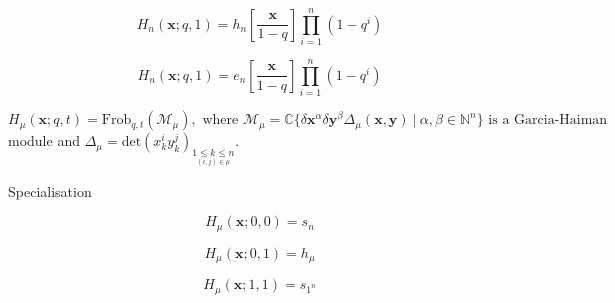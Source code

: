 \documentclass[12pt]{amsart}
\begin{document}
\begin{mdframed}[linecolor=red!20,linewidth=3pt,innertopmargin=8pt]
	\begin{minipage}[t]{9cm}
		\begin{bf}\end{bf}
		\begin{equation}H_n(\bm{x};q,1)=h_n\left[\frac{\bm{x}}{1-q}\right]\overset{n}{\underset{i=1}{\prod}}(1-q^i)
		\end{equation}
	\end{minipage}
	\begin{minipage}[t]{10cm}
		\begin{bf}\end{bf}
		\begin{equation}H_n(\bm{x};q,1)=e_n\left[\frac{\bm{x}}{1-q}\right]\overset{n}{\underset{i=1}{\prod}}(1-q^i)
		\end{equation}
	\end{minipage}
	\begin{minipage}[t]{19.25cm}
		 \begin{equation} H_\mu(\bm{x};q,t)=\textrm{Frob}_{q,t}(\mathcal{M}_\mu),  \text{ where }  \mathcal{M_\mu}=\mathbb{C}\{\delta\bm{x}^\alpha\delta\bm{y}^\beta\Delta_\mu(\bm{x}, \bm{y})~|~\alpha, \beta \in \mathbb{N}^n\}\text{ is a Garcia-Haiman} 
		 \end{equation}
 module  and $\Delta_\mu=\textrm{det}(x_k^iy_k^j)_{\underset{(i,j)\in\mu}{1\leq k \leq n}}$.
 	\end{minipage}
 
	 \begin{minipage}[t]{7cm}
		\begin{bf}Specialisation\end{bf}
		\begin{equation}H_\mu(\bm{x};0,0)=s_n
		\end{equation}
	\end{minipage}
	\begin{minipage}[t]{6cm}
		\begin{equation}H_\mu(\bm{x};0,1)=h_\mu
		\end{equation}
	\end{minipage}
	\begin{minipage}[t]{6cm}
		\begin{equation}H_\mu(\bm{x};1,1)=s_{1^n}
		\end{equation}
	\end{minipage}
\end{mdframed}
\end{document}
